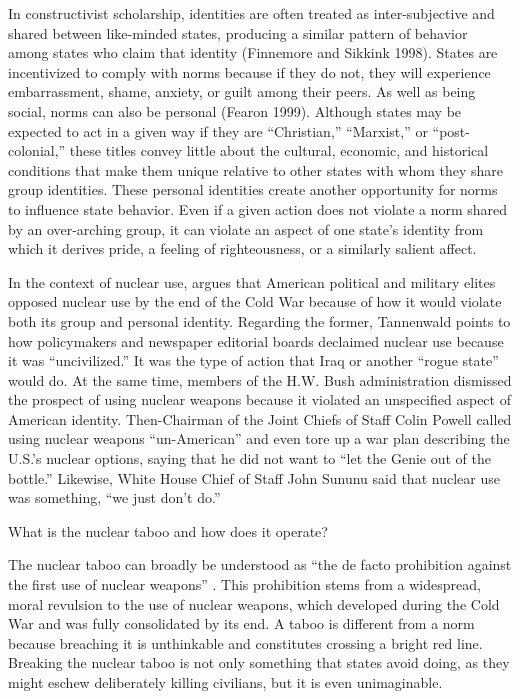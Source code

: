 \documentclass[12pt]{article}
\begin{document}
In constructivist scholarship, identities are often treated as inter-subjective and shared between like-minded states, producing a similar pattern of behavior among states who claim that identity (Finnemore and Sikkink 1998). States are incentivized to comply with norms because if they do not, they will experience embarrassment, shame, anxiety, or guilt among their peers. As well as being social, norms can also be personal (Fearon 1999). Although states may be expected to act in a given way if they are “Christian,” “Marxist,” or “post-colonial,” these titles convey little about the cultural, economic, and historical conditions that make them unique relative to other states with whom they share group identities. These personal identities create another opportunity for norms to influence state behavior. Even if a given action does not violate a norm shared by an over-arching group, it can violate an aspect of one state's identity from which it derives pride, a feeling of righteousness, or a similarly salient affect. 

In the context of nuclear use, \citet{tannenwald_nuclear_2007} argues that American political and military elites opposed nuclear use by the end of the Cold War because of how it would violate both its group and personal identity. Regarding the former, Tannenwald points to how policymakers and newspaper editorial boards declaimed nuclear use because it was “uncivilized.” It was the type of action that Iraq or another “rogue state” would do. At the same time, members of the H.W. Bush administration dismissed the prospect of using nuclear weapons because it violated an unspecified aspect of American identity. Then-Chairman of the Joint Chiefs of Staff Colin Powell called using nuclear weapons ``un-American'' and even tore up a war plan describing the U.S.'s nuclear options, saying that he did not want to “let the Genie out of the bottle.” Likewise, White House Chief of Staff John Sununu said that nuclear use was something, ``we just don't do.''

What is the nuclear taboo and how does it operate? 

The nuclear taboo can broadly be understood as ``the de facto prohibition against the first use of nuclear weapons'' \citep[10]{tannenwald_nuclear_2007}. This prohibition stems from a widespread, moral revulsion to the use of nuclear weapons, which developed during the Cold War and was fully consolidated by its end. A taboo is different from a norm because breaching it is unthinkable and constitutes crossing a bright red line. Breaking the nuclear taboo is not only something that states avoid doing, as they might eschew deliberately killing civilians, but it is even unimaginable.
\end{document}
